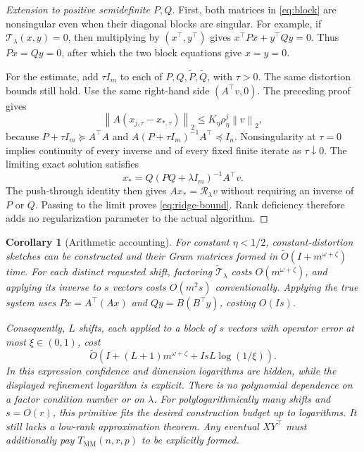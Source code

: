 \documentclass[11pt]{article}
\newtheorem{corollary}[theorem]{Corollary}
\theoremstyle{remark}
\newcommand{\norm}[1]{\left\lVert#1\right\rVert}
\newcommand{\MM}{T_{\mathrm{MM}}}
\newcommand{\tO}{\widetilde O}
\begin{document}
\begin{proof}[Extension to positive semidefinite \(P,Q\)]
First, both matrices in \eqref{eq:block} are nonsingular even when their
diagonal blocks are singular. For example, if
\(\mathcal T_\lambda(x,y)=0\), then multiplying by \((x^\top,y^\top)\)
gives \(x^\top Px+y^\top Qy=0\). Thus \(Px=Qy=0\), after which
the two block equations give \(x=y=0\).

For the estimate, add \(\tau I_m\) to each of \(P,Q,\widetilde P,
\widetilde Q\), with \(\tau>0\). The same distortion bounds still hold.
Use the same right-hand side \((A^\top v,0)\). The preceding proof gives
\[
 \norm{A(x_{j,\tau}-x_{*,\tau})}_2
 \leq K_\eta\rho_\eta^j\norm v_2,
\]
because \(P+\tau I_m\succeq A^\top A\) and
\(A(P+\tau I_m)^{-1}A^\top\preceq I_n\).
Nonsingularity at \(\tau=0\) implies continuity of every inverse and of
every fixed finite iterate as \(\tau\downarrow0\).
The limiting exact solution satisfies
\[
 x_*=Q(PQ+\lambda I_m)^{-1}A^\top v.
\]
The push-through identity then gives \(Ax_*=\mathcal R_\lambda v\)
without requiring an inverse of \(P\) or \(Q\). Passing to the limit proves
\eqref{eq:ridge-bound}. Rank deficiency therefore adds no regularization
parameter to the actual algorithm.
\end{proof}

\begin{corollary}[Arithmetic accounting]\label{cor:cost}
For constant \(\eta<1/2\), constant-distortion sketches can be constructed
and their Gram matrices formed in \(\tO(I+m^{\omega+\zeta})\) time.
For each distinct requested shift, factoring
\(\widetilde{\mathcal T}_\lambda\) costs
\(O(m^{\omega+\zeta})\), and applying its inverse to \(s\) vectors
costs \(O(m^2s)\) conventionally. Applying the true system uses
\(P x=A^\top(Ax)\) and \(Qy=B(B^\top y)\), costing \(O(Is)\).

Consequently, \(L\) shifts, each applied to a block of \(s\) vectors with
operator error at most \(\xi\in(0,1)\), cost
\[
 \tO\!\left(I+(L+1)m^{\omega+\zeta}
              +IsL\log(1/\xi)\right).
\]
In this expression confidence and dimension logarithms are hidden, while
the displayed refinement logarithm is explicit. There is no polynomial
dependence on a factor condition number or on \(\lambda\).
For polylogarithmically many shifts and \(s=O(r)\), this primitive fits
the desired construction budget up to logarithms. It still lacks a
low-rank approximation theorem. Any eventual \(XY^\top\) must additionally
pay \(\MM(n,r,p)\) to be explicitly formed.
\end{corollary}
\end{document}
